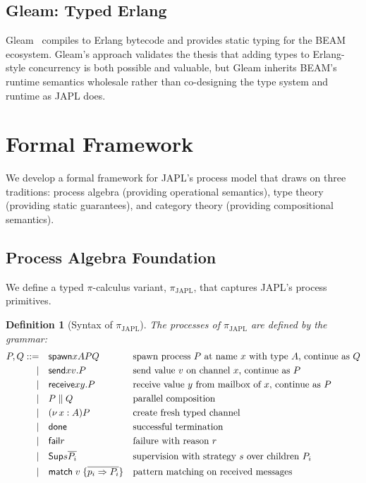 \documentclass[11pt,a4paper]{article}
\newtheorem{definition}[theorem]{Definition}
\newcommand{\ppar}{\;\|\;}
\newcommand{\pnew}[1]{(\nu\, #1)}
\newcommand{\Sup}{\mathsf{Sup}}
\newcommand{\spawn}{\mathsf{spawn}}
\newcommand{\sendf}{\mathsf{send}}
\newcommand{\recvf}{\mathsf{receive}}
\newcommand{\donef}{\mathsf{done}}
\newcommand{\failf}{\mathsf{fail}}
\begin{document}
\subsection{Gleam: Typed Erlang}

Gleam~\citep{gleam2023} compiles to Erlang bytecode and provides static typing for the BEAM ecosystem. Gleam's approach validates the thesis that adding types to Erlang-style concurrency is both possible and valuable, but Gleam inherits BEAM's runtime semantics wholesale rather than co-designing the type system and runtime as JAPL does.


\section{Formal Framework}\label{sec:formal}

We develop a formal framework for JAPL's process model that draws on three traditions: process algebra (providing operational semantics), type theory (providing static guarantees), and category theory (providing compositional semantics).

\subsection{Process Algebra Foundation}

We define a typed $\pi$-calculus variant, $\pi_{\text{JAPL}}$, that captures JAPL's process primitives.

\begin{definition}[Syntax of $\pi_{\text{JAPL}}$]\label{def:syntax}
The processes of $\pi_{\text{JAPL}}$ are defined by the grammar:
\begin{align}
P, Q ::= \quad & \spawn{x}{A}{P}{Q} && \text{spawn process $P$ at name $x$ with type $A$, continue as $Q$} \notag \\
\mid \quad & \sendf{x}{v}.P && \text{send value $v$ on channel $x$, continue as $P$} \notag \\
\mid \quad & \recvf{x}{y}.P && \text{receive value $y$ from mailbox of $x$, continue as $P$} \notag \\
\mid \quad & P \ppar Q && \text{parallel composition} \notag \\
\mid \quad & \pnew{x : A} P && \text{create fresh typed channel} \notag \\
\mid \quad & \donef && \text{successful termination} \notag \\
\mid \quad & \failf{r} && \text{failure with reason $r$} \notag \\
\mid \quad & \Sup{s}{\overline{P_i}} && \text{supervision with strategy $s$ over children $P_i$} \notag \\
\mid \quad & \mathsf{match}\; v\; \{\overline{p_i \Rightarrow P_i}\} && \text{pattern matching on received messages} \notag
\end{align}
\end{definition}
\end{document}
